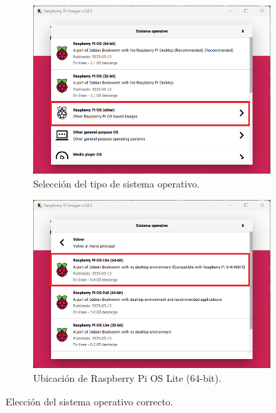 \documentclass[12pt]{article}
\begin{document}
\begin{itemize}
        \begin{figure}[H]
            \centering
            \begin{subfigure}[b]{0.48\linewidth}
                \centering
                \includegraphics[width=\linewidth]{rpi_version1.png}
                \caption{Selección del tipo de sistema operativo.}
                \label{fig:rpi_version1}
            \end{subfigure}
            \hfill
            \begin{subfigure}[b]{0.48\linewidth}
                \centering
                \includegraphics[width=\linewidth]{rpi_version2.png}
                \caption{Ubicación de Raspberry Pi OS Lite (64-bit).}
                \label{fig:rpi_version2}
            \end{subfigure}
            \caption{Elección del sistema operativo correcto.}
            \label{fig:rpi_versions}
        \end{figure}


\end{itemize}
\end{document}
